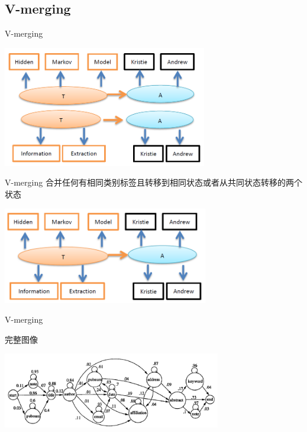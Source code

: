 \documentclass{beamer}
\begin{document}
\subsection{V-merging}
\begin{frame}{V-merging}
    \begin{center}
        \includegraphics[height=150pt]{report5/v-merge-1.png}
    \end{center}
\end{frame}

\begin{frame}{V-merging}
    合并任何有相同类别标签且转移到相同状态或者从共同状态转移的两个状态
            \pause
    \begin{center}
        \includegraphics[height=120pt]{report5/v-merge-2.png}
    \end{center}
\end{frame}

\begin{frame}{V-merging}
    \begin{block}{完整图像}
    \begin{center}
        \includegraphics[width=270pt]{report5/v-merge-3.png}
    \end{center}
    \end{block}
\end{frame}
\end{document}
